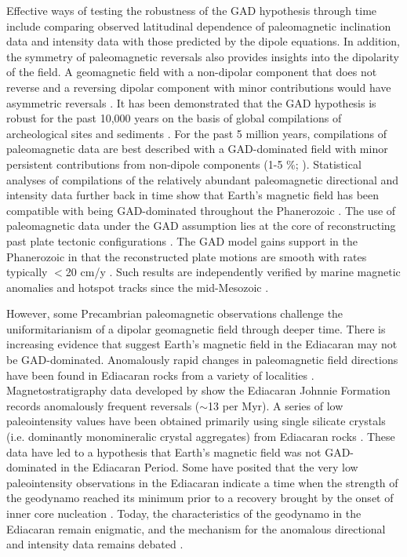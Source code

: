 Effective ways of testing the robustness of the GAD hypothesis through time include comparing observed latitudinal dependence of paleomagnetic inclination data and intensity data with those predicted by the dipole equations. In addition, the symmetry of paleomagnetic reversals also provides insights into the dipolarity of the field. A geomagnetic field with a non-dipolar component that does not reverse and a reversing dipolar component with minor contributions would have asymmetric reversals \citep[e.g.][]{Pesonen1981a, Pesonen1983a}. It has been demonstrated that the GAD hypothesis is robust for the past 10,000 years on the basis of global compilations of archeological sites and sediments \cite[e.g.][]{McElhinny1996a}. For the past 5 million years, compilations of paleomagnetic data are best described with a GAD-dominated field with minor persistent contributions from non-dipole components (1-5 \%; \citealp{Tauxe2005a, Valet2011b}). Statistical analyses of compilations of the relatively abundant paleomagnetic directional and intensity data further back in time show that Earth's magnetic field has been compatible with being GAD-dominated throughout the Phanerozoic \citep{Evans1976a, Lhuillier2023a}. The use of paleomagnetic data under the GAD assumption lies at the core of reconstructing past plate tectonic configurations \citep{Creer1954a, Irving1977a, Besse2002a, Torsvik2012a}. The GAD model gains support in the Phanerozoic in that the reconstructed plate motions are smooth with rates typically $<$20 cm/y \citep{Torsvik2012a}. Such results are independently verified by marine magnetic anomalies and hotspot tracks since the mid-Mesozoic \citep{Doubrovine2012a, Muller1993a}.

However, some Precambrian paleomagnetic observations challenge the uniformitarianism of a dipolar geomagnetic field through deeper time. There is increasing evidence that suggest Earth's magnetic field in the Ediacaran may not be GAD-dominated. Anomalously rapid changes in paleomagnetic field directions have been found in Ediacaran rocks from a variety of localities \cite[e.g.][]{Abrajevitch2010a, Meert2014a, Halls2015a}. Magnetostratigraphy data developed by \cite{Kodama2021a} show the Ediacaran Johnnie Formation records anomalously frequent reversals ($\sim$13 per Myr). A series of low paleointensity values have been obtained primarily using single silicate crystals (i.e. dominantly monomineralic crystal aggregates) from Ediacaran rocks \citep{Bono2019a, Thallner2021b, Thallner2021a}. These data have led to a hypothesis that Earth's magnetic field was not GAD-dominated in the Ediacaran Period. Some have posited that the very low paleointensity observations in the Ediacaran indicate a time when the strength of the geodynamo reached its minimum prior to a recovery brought by the onset of inner core nucleation \cite[e.g.][]{Bono2019a}. Today, the characteristics of the geodynamo in the Ediacaran remain enigmatic, and the mechanism for the anomalous directional and intensity data remains debated \citep{Domeier2023a}.

